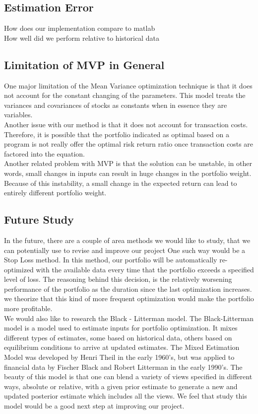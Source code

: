\documentclass[12pt,titlepage,a4paper]{article}
\begin{document}
\subsection{Estimation Error}
How does our implementation compare to matlab\\
How well did we perform relative to historical data

\subsection{Limitation of MVP in General}
One major limitation of the Mean Variance optimization technique is that it does not account for the constant changing of the parameters. This model treats the variances and covariances of stocks as constants when in essence they are variables. \\

Another issue with our method is that it does not account for transaction costs. Therefore, it is possible that the portfolio indicated as optimal based on a program is not really offer the optimal risk return ratio once transaction costs are factored into the equation.\\

Another related problem with MVP is that the solution can be unstable, in other words, small changes in inputs can result in huge changes in the portfolio weight. Because of this instability, a small change in the expected return can lead to entirely different portfolio weight. \\

\subsection{Future Study}
In the future, there are a couple of area methods we would like to study, that we can potentially use to revise and improve our project
One such way would be a Stop Loss method. In this method, our portfolio will be automatically re-optimized with the available data every time that the portfolio exceeds a specified level of loss. The reasoning behind this decision, is the relatively worsening performance of the portfolio as the duration since the last optimization increases. we theorize that this kind of more frequent 
optimization would make the portfolio more profitable.\\

We would also like to research the Black - Litterman model. The Black-Litterman model is a model used to estimate inputs for portfolio optimization. It mixes different types of estimates, some based on historical data, others based on equilibrium conditions to arrive at updated estimates. The Mixed Estimation Model was developed by Henri Theil in the early 1960's, but was applied to financial data by Fischer Black and Robert Litterman in the early 1990's.
The beauty of this model is that one can blend a variety of views specified in different ways, absolute or relative, with a given prior estimate to generate a new and updated posterior estimate which includes all the views.  We feel that study this model would be a good next step at improving our project.\\
\end{document}
